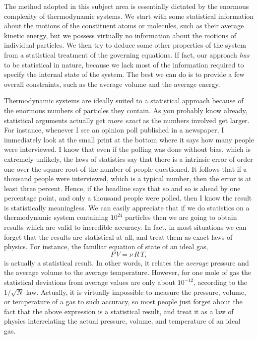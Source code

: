 The method adopted in this subject area is essentially dictated by the 
enormous complexity of thermodynamic systems. We start with some
statistical information about the motions of the constituent atoms or molecules,
 such as their average
kinetic energy, 
 but we possess virtually
no information about the motions of individual particles. We then try
to deduce some other  properties of the system
from a  statistical treatment of the governing equations. 
If fact, our approach 
 {\em has}\/ to be statistical in nature, because we lack most of the
information required to specify the internal state of the system. The best we
can do is to provide a few overall constraints, such as the average volume and
 the
average energy. 

Thermodynamic systems are ideally suited to a statistical approach because of
the enormous numbers of particles they contain. As  you probably know
already, 
statistical arguments actually 
get {\em more exact}\/ as the numbers involved get larger.
For instance, whenever I see an opinion poll published
in a newspaper, I immediately
look at the small print  at the bottom where it says how many people
were interviewed. I know that even if the polling was done without bias,
which is extremely unlikely,
the laws of statistics say that there is a intrinsic error of order 
one over the square root of the number of people questioned.
 It follows that
 if a
 thousand people were interviewed, which is a typical number,
then  the error is at least three percent. Hence, if the headline
 says that so and so
is ahead by one percentage point, and only a thousand people were
polled, then I know the result is statistically meaningless.
We  can easily 
appreciate that if we do statistics on a thermodynamic system containing
$10^{24}$ particles then we are going to  obtain results which are valid to
incredible accuracy. In fact, in most situations we can forget that the
results are statistical at all, and treat them as exact laws of physics.
	For instance, the familiar equation of state of an ideal gas,
$$
P\,V =\nu\, R\,T,
$$
is actually a statistical result. In other words, it relates the {\em
average}\/ pressure and the average volume to the average temperature.
However, for one mole of gas the statistical deviations from average
values are only about $10^{-12}$, according to the $1/\sqrt{N}$ law.
Actually, it is virtually
impossible to  measure  the pressure, volume, or temperature of a gas
to such accuracy, so most people just forget about the fact that the above
expression
is a statistical result, and treat it as a law of physics interrelating
the actual pressure, volume, and temperature of an ideal gas.


